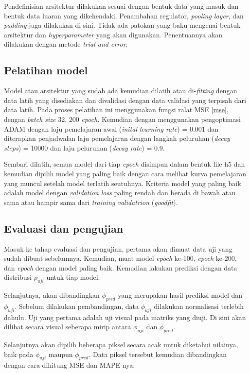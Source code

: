 Pendefinisian arsitektur dilakukan sesuai dengan bentuk data yang masuk dan bentuk data luaran yang dikehendaki. Penambahan regulator, \emph{pooling layer}, dan \emph{padding} juga dilakukan di sini. Tidak ada patokan yang baku mengenai bentuk arsitektur dan \emph{hyperparameter} yang akan digunakan. Penentuannya akan dilakukan dengan metode \emph{trial and error}.

\subsection{Pelatihan model}
Model atau arsitektur yang sudah ada kemudian dilatih atau di-\emph{fitting} dengan data latih yang disediakan dan divalidasi dengan data validasi yang terpisah dari data latih. Pada proses pelatihan ini menggunakan fungsi ralat MSE \ref{mse}, dengan \emph{batch size} 32, 200 \emph{epoch}. Kemudian dengan menggunakan pengoptimasi ADAM \citep{kingma2017adam} dengan laju pemelajaran awal (\emph{inital learning rate}) = 0.001 dan diterapkan penjadwalan laju pemelajaran dengan langkah peluruhan (\emph{decay steps}) = 10000 dan laju peluruhan (\emph{decay rate}) = 0.9.

Sembari dilatih, semua model dari tiap \emph{epoch} disimpan dalam bentuk file h5 dan kemudian dipilih model yang paling baik dengan cara melihat kurva pemelajaran yang muncul setelah model terlatih seutuhnya. Kriteria model yang paling baik adalah model dengan \emph{validation loss} paling rendah dan berada di bawah atau sama atau hampir sama dari \emph{training validatrion} (\emph{goodfit}).

\subsection{Evaluasi dan pengujian}
Masuk ke tahap evaluasi dan pengujian, pertama akan dimuat data uji yang sudah dibuat sebelumnya. Kemudian, muat model \emph{epoch} ke-100, \emph{epoch} ke-200, dan \emph{epoch} dengan model paling baik. Kemudian lakukan prediksi dengan data distribusi $\rho_{uji}$ untuk tiap model.

Selanjutnya, akan dibandingkan $\phi_{pred}$ yang merupakan hasil prediksi model dan $\phi_{uji}$. Sebelum dilakukan pembandingan, data $\phi_{uji}$ dilakukan normalisasi terlebih dahulu. Uji yang pertama adalah uji visual pada matriks yang diuji. Di sini akan dilihat secara visual seberapa mirip antara $\phi_{uji}$ dan $\phi_{pred}$.

Selanjutnya akan dipilih beberapa piksel secara acak untuk diketahui nilainya, baik pada $\phi_{uji}$ maupun $\phi_{pred}$. Data piksel tersebut kemudian dibandingkan dengan cara dihitung MSE dan MAPE-nya.


